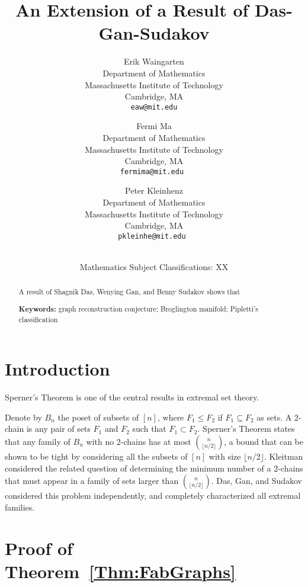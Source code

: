 \documentclass[12pt]{article}
\title{\bf An Extension of a Result of Das-Gan-Sudakov}
\author{Erik Waingarten\\
\small Department of Mathematics\\[-0.8ex]
\small Massachusetts Institute of Technology\\[-0.8ex] 
\small Cambridge, MA\\
\small\tt eaw@mit.edu\\
\and
Fermi Ma\\
\small Department of Mathematics\\[-0.8ex]
\small Massachusetts Institute of Technology\\[-0.8ex]
\small Cambridge, MA\\
\small\tt fermima@mit.edu
\and
Peter Kleinhenz\\
\small Department of Mathematics\\[-0.8ex]
\small Massachusetts Institute of Technology\\[-0.8ex]
\small Cambridge, MA\\
\small\tt pkleinhe@mit.edu
}
\date{\dateline{August 1, 2014}{XX}\\
\small Mathematics Subject Classifications: XX}
\theoremstyle{plain}
\theoremstyle{definition}
\theoremstyle{remark}
\begin{document}
\maketitle


\begin{abstract}
  A result of Shagnik Das, Wenying Gan, and Benny Sudakov shows that

  \bigskip\noindent \textbf{Keywords:} graph reconstruction
  conjecture; Broglington manifold; Pipletti's classification
\end{abstract}

\section{Introduction}

Sperner's Theorem is one of the central results in extremal set theory. 

Denote by $B_n$ the poset of subsets of $[n]$, where $F_1 \leq F_2$ if $F_1 \subseteq F_2$ as sets. A 2-chain is any pair of sets $F_1$ and $F_2$ such that $F_1 \subset F_2$. Sperner's Theorem states that any family of $B_n$ with no 2-chains has at most $\binom{n}{\lfloor n/2 \rfloor}$, a bound that can be shown to be tight by considering all the subsets of $[n]$ with size $\lfloor n/2 \rfloor$. Kleitman considered the related question of determining the minimum number of a 2-chains that must appear in a family of sets larger than $\binom{n}{\lfloor n/2 \rfloor}$. Das, Gan, and Sudakov considered this problem independently, and completely characterized all extremal families.

\section{Proof of Theorem~\ref{Thm:FabGraphs}}
\end{document}
